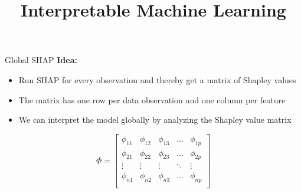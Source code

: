 \documentclass[11pt,compress,t,notes=noshow, aspectratio=169, xcolor=table]{beamer}
\title{Interpretable Machine Learning}
\date{}
\begin{document}
\newcommand{\titlefigure}{figure_man/global_shap_depend_season.pdf}
\newcommand{\learninggoals}{
\item Understand how SHAP values can be aggregated for global model interpretation
\item Learn global SHAP visualizations: feature importance, summary, and dependence plots
\item Recognize advantages and limitations of global SHAP explanations
}


\begin{frame}{Global SHAP }
\textbf{Idea: }
\begin{itemize}
    \item Run SHAP for every observation and thereby get a matrix of Shapley values
    \item The matrix has one row per data observation and one column per feature
    \item We can interpret the model globally by analyzing the Shapley value matrix
\end{itemize}
\vspace{2cm}
$$
\Phi =
\begin{bmatrix}
    \phi_{11} & \phi_{12} & \phi_{13} & \dots  & \phi_{1p} \\
    \phi_{21} & \phi_{22} & \phi_{23} & \dots  & \phi_{2p} \\
    \vdots & \vdots & \vdots & \ddots & \vdots \\
    \phi_{n1} & \phi_{n2} & \phi_{n3} & \dots  & \phi_{np} \\
\end{bmatrix}
$$

 \end{frame}
\end{document}
